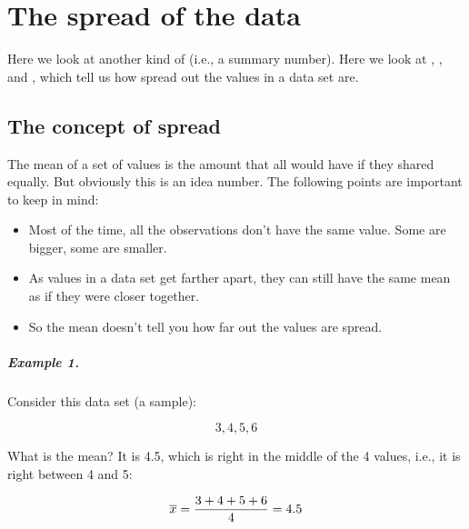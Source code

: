 \documentclass[../../../main.tex]{subfiles}
\begin{document}
\chapter{The spread of the data}

Here we look at another kind of  (i.e., a summary number). Here we look at , , and , which tell us how spread out the values in a data set are.


\section{The concept of spread}

The mean of a set of values is the amount that all would have if they shared equally. But obviously this is an idea number. The following points are important to keep in mind:

\begin{itemize}

  \item Most of the time, all the observations don't have the same value. Some are bigger, some are smaller.

  \item As values in a data set get farther apart, they can still have the same mean as if they were closer together.
  
  \item So the mean doesn't tell you how far out the values are spread.  

\end{itemize}


\paragraph{Example 1.}

Consider this data set (a sample):

\begin{equation*}
  3, 4, 5, 6
\end{equation*}

\noindent
What is the mean? It is 4.5, which is right in the middle of the 4 values, i.e., it is right between 4 and 5:

\begin{equation*}
  \overline{x} = \frac{3 + 4 + 5 + 6}{4} = 4.5
\end{equation*}
\end{document}
